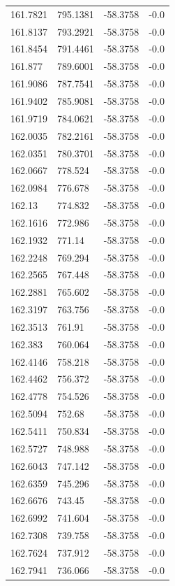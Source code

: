 \begin{table}[H]
\begin{tabular}{llll}
161.7821 & 795.1381 & -58.3758 & -0.0 \\
161.8137 & 793.2921 & -58.3758 & -0.0 \\
161.8454 & 791.4461 & -58.3758 & -0.0 \\
161.877 & 789.6001 & -58.3758 & -0.0 \\
161.9086 & 787.7541 & -58.3758 & -0.0 \\
161.9402 & 785.9081 & -58.3758 & -0.0 \\
161.9719 & 784.0621 & -58.3758 & -0.0 \\
162.0035 & 782.2161 & -58.3758 & -0.0 \\
162.0351 & 780.3701 & -58.3758 & -0.0 \\
162.0667 & 778.524 & -58.3758 & -0.0 \\
162.0984 & 776.678 & -58.3758 & -0.0 \\
162.13 & 774.832 & -58.3758 & -0.0 \\
162.1616 & 772.986 & -58.3758 & -0.0 \\
162.1932 & 771.14 & -58.3758 & -0.0 \\
162.2248 & 769.294 & -58.3758 & -0.0 \\
162.2565 & 767.448 & -58.3758 & -0.0 \\
162.2881 & 765.602 & -58.3758 & -0.0 \\
162.3197 & 763.756 & -58.3758 & -0.0 \\
162.3513 & 761.91 & -58.3758 & -0.0 \\
162.383 & 760.064 & -58.3758 & -0.0 \\
162.4146 & 758.218 & -58.3758 & -0.0 \\
162.4462 & 756.372 & -58.3758 & -0.0 \\
162.4778 & 754.526 & -58.3758 & -0.0 \\
162.5094 & 752.68 & -58.3758 & -0.0 \\
162.5411 & 750.834 & -58.3758 & -0.0 \\
162.5727 & 748.988 & -58.3758 & -0.0 \\
162.6043 & 747.142 & -58.3758 & -0.0 \\
162.6359 & 745.296 & -58.3758 & -0.0 \\
162.6676 & 743.45 & -58.3758 & -0.0 \\
162.6992 & 741.604 & -58.3758 & -0.0 \\
162.7308 & 739.758 & -58.3758 & -0.0 \\
162.7624 & 737.912 & -58.3758 & -0.0 \\
162.7941 & 736.066 & -58.3758 & -0.0 \\

\end{tabular}
\end{table}
